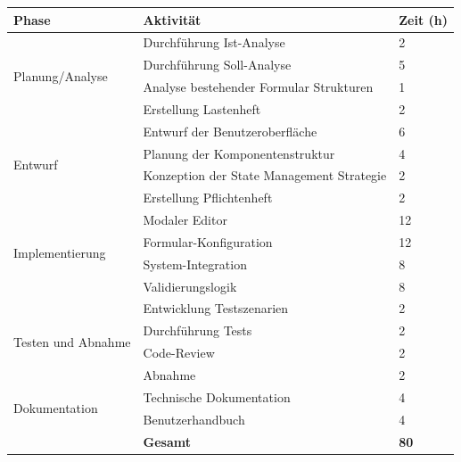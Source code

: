 \documentclass[a4paper,11pt]{article}
\begin{document}
\begin{longtable}{lll}
\toprule
\textbf{Phase} & \textbf{Aktivität} & \textbf{Zeit (h)} \\
\midrule
\multirow{4}{*}{Planung/Analyse} & Durchführung Ist-Analyse & 2 \\
 & Durchführung Soll-Analyse & 5 \\
 & Analyse bestehender Formular Strukturen & 1 \\
 & Erstellung Lastenheft & 2 \\
\midrule
\multirow{4}{*}{Entwurf} & Entwurf der Benutzeroberfläche & 6 \\
 & Planung der Komponentenstruktur & 4 \\
 & Konzeption der State Management Strategie & 2 \\
 & Erstellung Pflichtenheft & 2 \\
\midrule
\multirow{4}{*}{Implementierung} & Modaler Editor & 12 \\
 & Formular-Konfiguration & 12 \\
 & System-Integration & 8 \\
 & Validierungslogik & 8 \\
\midrule
\multirow{4}{*}{Testen und Abnahme} & Entwicklung Testszenarien & 2 \\
 & Durchführung Tests & 2 \\
 & Code-Review & 2 \\
 & Abnahme & 2 \\
\midrule
\multirow{2}{*}{Dokumentation} & Technische Dokumentation & 4 \\
 & Benutzerhandbuch & 4 \\
\midrule
 & \textbf{Gesamt} & \textbf{80} \\
\bottomrule
\end{longtable}
\end{document}

